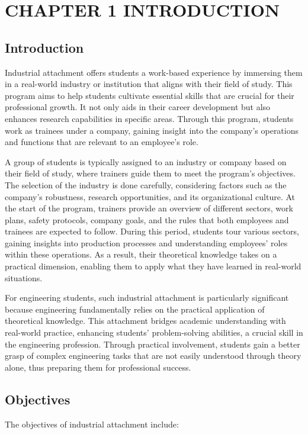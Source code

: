 
\section{CHAPTER 1 INTRODUCTION}
\subsection{Introduction}
Industrial attachment offers students a work-based experience by immersing them in a real-world industry or institution that aligns with their field of study. This program aims to help students cultivate essential skills that are crucial for their professional growth. It not only aids in their career development but also enhances research capabilities in specific areas. Through this program, students work as trainees under a company, gaining insight into the company’s operations and functions that are relevant to an employee’s role.

A group of students is typically assigned to an industry or company based on their field of study, where trainers guide them to meet the program’s objectives. The selection of the industry is done carefully, considering factors such as the company’s robustness, research opportunities, and its organizational culture. At the start of the program, trainers provide an overview of different sectors, work plans, safety protocols, company goals, and the rules that both employees and trainees are expected to follow. During this period, students tour various sectors, gaining insights into production processes and understanding employees’ roles within these operations. As a result, their theoretical knowledge takes on a practical dimension, enabling them to apply what they have learned in real-world situations.

For engineering students, such industrial attachment is particularly significant because engineering fundamentally relies on the practical application of theoretical knowledge. This attachment bridges academic understanding with real-world practice, enhancing students’ problem-solving abilities, a crucial skill in the engineering profession. Through practical involvement, students gain a better grasp of complex engineering tasks that are not easily understood through theory alone, thus preparing them for professional success.

\subsection{Objectives}
The objectives of industrial attachment include:

